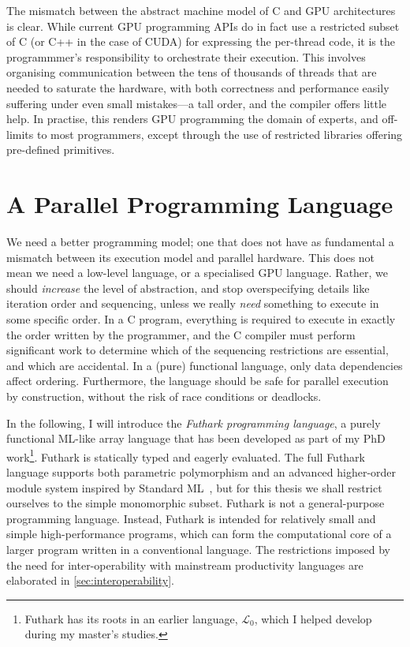 The mismatch between the abstract machine model of C and GPU
architectures is clear.  While current GPU programming APIs do in fact
use a restricted subset of C (or C++ in the case of CUDA) for
expressing the per-thread code, it is the programmmer's responsibility
to orchestrate their execution.  This involves organising
communication between the tens of thousands of threads that are needed
to saturate the hardware, with both correctness and performance easily
suffering under even small mistakes---a tall order, and the compiler
offers little help.  In practise, this renders GPU programming the
domain of experts, and off-limits to most programmers, except through
the use of restricted libraries offering pre-defined primitives.

\section{A Parallel Programming Language}

We need a better programming model; one that does not have as
fundamental a mismatch between its execution model and parallel
hardware.  This does not mean we need a low-level language, or a
specialised GPU language.  Rather, we should \textit{increase} the
level of abstraction, and stop overspecifying details like iteration
order and sequencing, unless we really \textit{need} something to
execute in some specific order.  In a C program, everything is
required to execute in exactly the order written by the programmer,
and the C compiler must perform significant work to determine which
of the sequencing restrictions are essential, and which are
accidental.  In a (pure) functional language, only data dependencies
affect ordering.  Furthermore, the language should be safe for
parallel execution by construction, without the risk of race
conditions or deadlocks.

In the following, I will introduce the \textit{Futhark programming
  language}, a purely functional ML-like array language that has been
developed as part of my PhD work\footnote{Futhark has its roots in an
  earlier language, $\mathcal{L}_0$, which I helped develop during my
  master's studies.}.  Futhark is statically typed and eagerly
evaluated.  The full Futhark language supports both parametric
polymorphism and an advanced higher-order module system inspired by
Standard ML~\cite{Milner:1997:DSM:549659}, but for this thesis we
shall restrict ourselves to the simple monomorphic subset.  Futhark is
not a general-purpose programming language. Instead, Futhark is
intended for relatively small and simple high-performance programs,
which can form the computational core of a larger program written in a
conventional language.  The restrictions imposed by the need for
inter-operability with mainstream productivity languages are
elaborated in \cref{sec:interoperability}.

